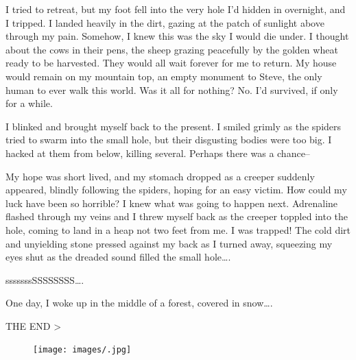 \documentclass[]{book}
\begin{document}
I tried to retreat, but my foot fell into the very hole I'd hidden in
overnight, and I tripped. I landed heavily in the dirt, gazing at the
patch of sunlight above through my pain. Somehow, I knew this was the
sky I would die under. I thought about the cows in their pens, the sheep
grazing peacefully by the golden wheat ready to be harvested. They would
all wait forever for me to return. My house would remain on my mountain
top, an empty monument to Steve, the only human to ever walk this world.
Was it all for nothing? No. I'd survived, if only for a while.

I blinked and brought myself back to the present. I smiled grimly as the
spiders tried to swarm into the small hole, but their disgusting bodies
were too big. I hacked at them from below, killing several. Perhaps
there was a chance--

My hope was short lived, and my stomach dropped as a creeper suddenly
appeared, blindly following the spiders, hoping for an easy victim. How
could my luck have been so horrible? I knew what was going to happen
next. Adrenaline flashed through my veins and I threw myself back as the
creeper toppled into the hole, coming to land in a heap not two feet
from me. I was trapped! The cold dirt and unyielding stone pressed
against my back as I turned away, squeezing my eyes shut as the dreaded
sound filled the small hole\ldots{}.

sssssssSSSSSSSS\ldots{}.

One day, I woke up in the middle of a forest, covered in snow\ldots{}.

THE END \textgreater{}

\begin{figure}[htbp]
\centering
\texttt{[image: images/.jpg]}
\caption{}
\end{figure}

\backmatter
\printindex
\end{document}
